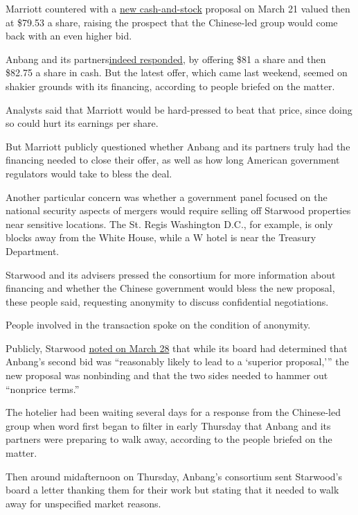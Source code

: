 Marriott countered with a
\href{http://www.nytimes.com/2016/03/22/business/dealbook/marriott-raises-bid-for-starwood.html}{new
cash-and-stock} proposal on March 21 valued then at \$79.53 a share,
raising the prospect that the Chinese-led group would come back with an
even higher bid.

Anbang and its
partners\href{http://www.nytimes.com/2016/03/29/business/dealbook/starwood-bidding-war-increases-with-higher-offer.html}{indeed
responded}, by offering \$81 a share and then \$82.75 a share in cash.
But the latest offer, which came last weekend, seemed on shakier grounds
with its financing, according to people briefed on the matter.

Analysts said that Marriott would be hard-pressed to beat that price,
since doing so could hurt its earnings per share.

But Marriott publicly questioned whether Anbang and its partners truly
had the financing needed to close their offer, as well as how long
American government regulators would take to bless the deal.

Another particular concern was whether a government panel focused on the
national security aspects of mergers would require selling off Starwood
properties near sensitive locations. The St. Regis Washington D.C., for
example, is only blocks away from the White House, while a W hotel is
near the Treasury Department.

Starwood and its advisers pressed the consortium for more information
about financing and whether the Chinese government would bless the new
proposal, these people said, requesting anonymity to discuss
confidential negotiations.

People involved in the transaction spoke on the condition of anonymity.

Publicly, Starwood
\href{http://www.businesswire.com/news/home/20160328005392/en/Starwood-Hotels-Resorts-Board-Directors-Determines-Revised}{noted
on March 28} that while its board had determined that Anbang's second
bid was ``reasonably likely to lead to a `superior proposal,''' the new
proposal was nonbinding and that the two sides needed to hammer out
``nonprice terms.''

The hotelier had been waiting several days for a response from the
Chinese-led group when word first began to filter in early Thursday that
Anbang and its partners were preparing to walk away, according to the
people briefed on the matter.

Then around midafternoon on Thursday, Anbang's consortium sent
Starwood's board a letter thanking them for their work but stating that
it needed to walk away for unspecified market reasons.

